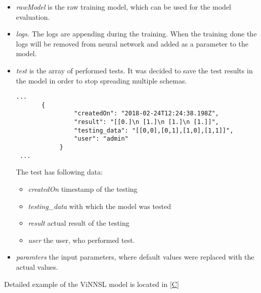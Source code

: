 \begin{itemize}
\item \emph{rawModel} is the raw training model, which can be used for the model evaluation. 
\item \emph{logs.} The logs are appending during the training. When the training done the logs will be removed from neural network and added as a parameter to the model.
\item \emph{test} is the array of performed tests. It was decided to save the test results in the model in order to stop spreading multiple schemas. 
 \begin{lstlisting}
...
       {
                "createdOn": "2018-02-24T12:24:38.198Z",
                "result": "[[0.]\n [1.]\n [1.]\n [1.]]",
                "testing_data": "[[0,0],[0,1],[1,0],[1,1]]",
                "user": "admin"
            }
 ...
\end{lstlisting}
The test has following data:
\begin{itemize}
\item \emph{createdOn} timestamp of the testing
\item \emph{testing\_data} with which the model was tested
\item \emph{result} actual result of the testing
\item \emph{user} the user, who performed test.
\end{itemize}
\item \emph{paramters} the input parameters, where default values were replaced with the actual values. 
\end{itemize}

Detailed example of the ViNNSL model is located in \autoref{C}
